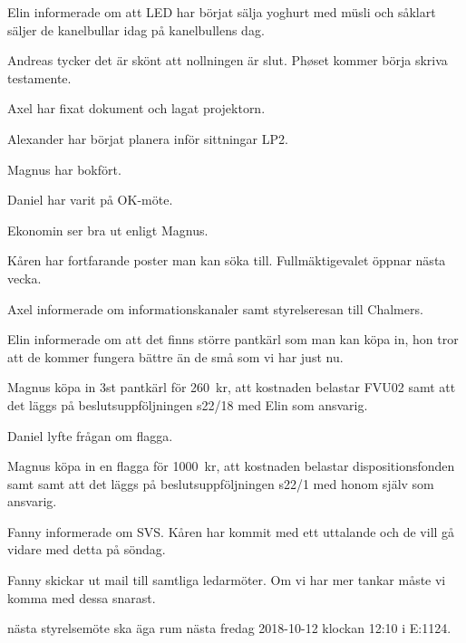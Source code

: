 \documentclass[10pt]{article}
\begin{document}
\begin{paragrafer}
\begin{paragrafer}
		Elin informerade om att LED har börjat sälja yoghurt med müsli och såklart säljer de kanelbullar idag på kanelbullens dag.

		Andreas tycker det är skönt att nollningen är slut. Phøset kommer börja skriva testamente. 

		Axel har fixat dokument och lagat projektorn. 

		Alexander har börjat planera inför sittningar LP2.

		Magnus har bokfört. 

		Daniel har varit på OK-möte.

	
		Ekonomin ser bra ut enligt Magnus.		
	
	
		Kåren har fortfarande poster man kan söka till. Fullmäktigevalet öppnar nästa vecka.

		
		Axel informerade om informationskanaler samt styrelseresan till Chalmers.

						
	\end{paragrafer}
		
	
	Elin informerade om att det finns större pantkärl som man kan köpa in, hon tror att de kommer fungera bättre än de små som vi har just nu. 

	\Mdf

	Magnus \ypa köpa in 3st pantkärl för \SI{260}{kr}, att kostnaden belastar FVU02 samt att det läggs på beslutsuppföljningen s22/18 med Elin som ansvarig.


	Daniel lyfte frågan om flagga.

	\Mdf

	Magnus \ypa köpa in en flagga för \SI{1000}{kr}, att kostnaden belastar dispositionsfonden samt samt att det läggs på beslutsuppföljningen s22/1 med honom själv som ansvarig.


	Fanny informerade om SVS. Kåren har kommit med ett uttalande och de vill gå vidare med detta på söndag.

	Fanny skickar ut mail till samtliga ledarmöter. Om vi har mer tankar måste vi komma med dessa snarast. 

	\Mba nästa styrelsemöte ska äga rum nästa fredag 2018-10-12 klockan 12:10 i E:1124.
		  

\end{paragrafer}
\end{document}
